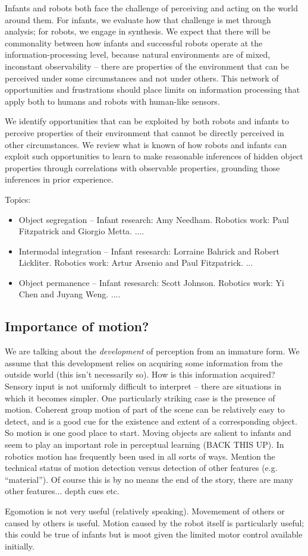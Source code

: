 
Infants and robots both face the challenge of perceiving and acting on
the world around them.  For infants, we evaluate how that challenge is
met through analysis; for robots, we engage in synthesis.  We expect
that there will be commonality between how infants and successful
robots operate at the information-processing level, because natural
environments are of mixed, inconstant observability -- there are
properties of the environment that can be perceived under some
circumstances and not under others.  This network of opportunities and
frustrations should place limits on information processing that apply
both to humans and robots with human-like sensors.

We identify opportunities that can be exploited by both robots and
infants to perceive properties of their environment that cannot be
directly perceived in other circumstances.  We review what is known of
how robots and infants can exploit such opportunities to learn to make
reasonable inferences of hidden object properties through correlations
with observable properties, grounding those inferences in prior
experience.

Topics:

\begin{itemize}

\item Object segregation --
  Infant research: Amy Needham.
  Robotics work: Paul Fitzpatrick and Giorgio Metta. ....

\item Intermodal integration --
  Infant resesarch: Lorraine Bahrick and Robert Lickliter.
  Robotics work: Artur Arsenio and Paul Fitzpatrick. ...

\item Object permanence --
  Infant resesarch: Scott Johnson.
  Robotics work: Yi Chen and Juyang Weng. ....

\end{itemize}

\subsection{Importance of motion?}

We are talking about the {\em development} of perception from an
immature form.  We assume that this development relies on acquiring
some information from the outside world (this isn't necessarily so).
How is this information acquired?  Sensory input is not 
uniformly difficult to interpret -- there are situations in
which it becomes simpler.  One particularly striking case is
the presence of motion.  Coherent group motion of part of the 
scene can be relatively easy to detect, and is a good cue for
the existence and extent of a corresponding object.  
So motion is one good place to start.
%
Moving objects are salient to infants and seem to play an
important role in perceptual learning (BACK THIS UP).
%
In robotics motion has frequently been used in all sorts of
ways.
%
Mention the technical status of motion detection versus
detection of other features (e.g. ``material'').
%
Of course this is by no means the end of the story, there 
are many other features... depth cues etc.

Egomotion is not very useful (relatively speaking).  Movemement of
others or caused by others is useful.  Motion caused by the robot
itself is particularly useful; this could be true of infants but is
moot given the limited motor control available initially.


